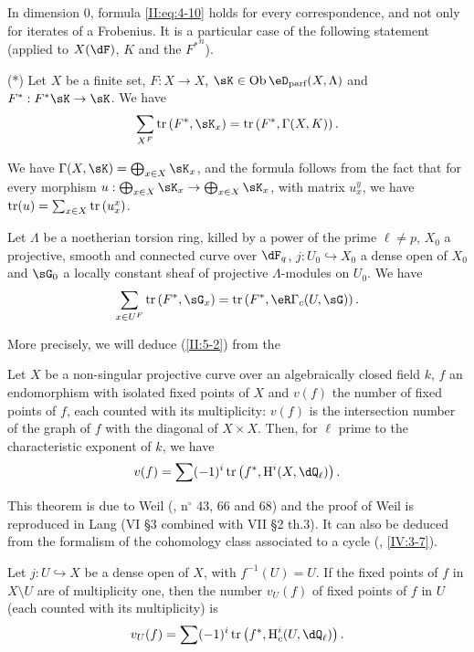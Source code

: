 In dimension $0$, formula \eqref{II:eq:4-10} holds for every
correspondence, and not only for iterates of a Frobenius. It is
a particular case of the following statement (applied to $X(\dF)$, $K$ and
the ${F^*}^n$).

(*) Let $X$ be a finite set, $F:X\to X$, $\sK\in\ob\eD_\text{parf}(X,\Lambda)$
and $F^*:F^* \sK\to \sK$. We have
\[
  \sum_{X^F} \tr\left(F^*,\sK_x\right) = \tr\left(F^*,\Gamma(X,K)\right) \text{.}
\]

We have $\Gamma(X,\sK)=\bigoplus_{x\in X} \sK_x$, and the formula follows from the fact that
for every morphism $u:\bigoplus_{x\in X} \sK_x\to \bigoplus_{x\in X} \sK_x$, with
matrix $u_x^y$, we have $\operatorname{tr}(u)=\sum_{x\in X} \operatorname{tr}\left(u_x^x\right)$.




\begin{lemma_}\label{II:5-2}
Let $\Lambda$ be a noetherian torsion ring, killed by a power of the
prime $\ell\ne p$, $X_0$ a projective, smooth and connected curve over
$\dF_q$, $j:U_0\hookrightarrow X_0$ a dense open of $X_0$ and $\sG_0$ a
locally constant sheaf of projective $\Lambda$-modules on $U_0$. We have
\[
  \sum_{x\in U^F} \tr\left(F^*,\sG_x\right) = \tr\left(F^*,\eR\Gamma_c(U,\sG)\right) \text{.}
\]
\end{lemma_}

More precisely, we will deduce (\ref{II:5-2}) from the




\begin{theorem_}\label{II:5-3}
Let $X$ be a non-singular projective curve over an algebraically closed
field $k$, $f$ an endomorphism with isolated fixed points of $X$ and $v(f)$ the
number of fixed points of $f$, each counted with its multiplicity:
$v(f)$ is the intersection number of the graph of $f$ with the diagonal of
$X\times X$. Then, for $\ell$ prime to the characteristic exponent of $k$,
we have
\[
  v(f) = \sum (-1)^i \tr\left(f^*,\h^i(X,\dQ_\ell)\right) \text{.}
\]
\end{theorem_}

This theorem is due to Weil (\cite{we48}, n$^\circ$ 43, 66 and 68) and the
proof of Weil is reproduced in Lang \cite{la83} (VI \S3 combined
with VII \S2 th.3). It can also be deduced from the formalism of the
cohomology class associated to a cycle (, \ref{IV:3-7}).




\begin{corollary_}\label{II:5-4}
Let $j:U\hookrightarrow X$ be a dense open of $X$, with $f^{-1}(U)=U$. If
the fixed points of $f$ in $X\setminus U$ are of multiplicity one, then the
number $v_U(f)$ of fixed points of $f$ in $U$ (each counted with its
multiplicity) is
\[
  v_U(f) = \sum (-1)^i \tr\left(f^*,\h_c^i(U,\dQ_\ell)\right) \text{.}
\]
\end{corollary_}

